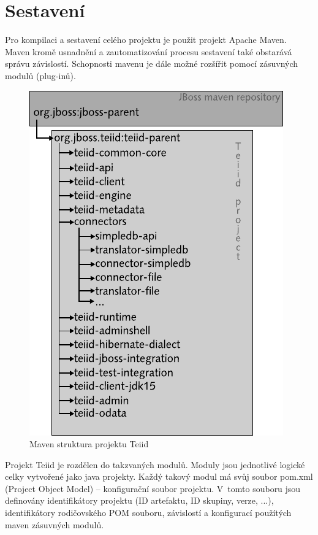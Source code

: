 \documentclass[oneside,12pt]{fithesis2}
\begin{document}
\section{Sestavení}
\label{sestaveni}
Pro kompilaci a sestavení celého projektu je použit projekt Apache Maven. Maven kromě usnadnění a zautomatizování procesu sestavení také obstarává správu závislostí. Schopnosti mavenu je dále možné rozšířit pomocí zásuvných modulů (plug-inů).
\begin{figure}[h]
 \centering
 \includegraphics[scale=1]{mavenStructure}
 \caption{Maven struktura projektu Teiid}
\end{figure}

Projekt Teiid je rozdělen do takzvaných modulů. Moduly jsou jednotlivé logické celky vytvořené jako java projekty. Každý takový modul má svůj soubor pom.xml (Project Object Model) -- konfigurační soubor projektu. V~tomto souboru jsou definovány identifikátory projektu (ID artefaktu, ID skupiny, verze, ...), identifikátory rodičovského POM souboru, závislostí a konfigurací použítých maven zásuvných modulů.
\end{document}
